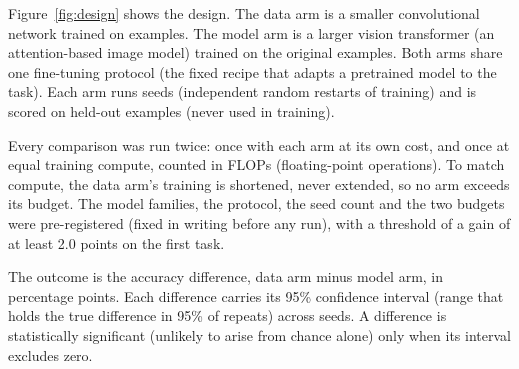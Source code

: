 \documentclass[pdflatex,sn-mathphys-num]{sn-jnl}
\newcommand{\lit}[1]{#1}
\begin{document}
Figure~\ref{fig:design} shows the design. The data arm is a smaller convolutional network
\cite{he2015} trained on \nTrainData{} examples. The model arm is a larger vision
transformer (an attention-based image model) \cite{dosovitskiy2020} trained on the
original \nTrainBase{} examples. Both arms share one fine-tuning protocol (the fixed recipe
that adapts a pretrained model to the task). Each arm runs \nSeeds{} seeds (independent
random restarts of training) and is scored on \nHeldout{} held-out examples (never used in
training).

Every comparison was run twice: once with each arm at its own cost, and once at equal
training compute, counted in FLOPs (floating-point operations). To match compute, the data
arm's training is shortened, never extended, so no arm exceeds its budget. The model
families, the protocol, the seed count and the two budgets were pre-registered (fixed in
writing before any run), with a threshold of a gain of at least \lit{2.0} points on the
first task.

The outcome is the accuracy difference, data arm minus model arm, in percentage points.
Each difference carries its \lit{95}\% confidence interval (range that holds the true
difference in \lit{95}\% of repeats) across seeds. A difference is statistically
significant (unlikely to arise from chance alone) only when its interval excludes zero.
\end{document}
